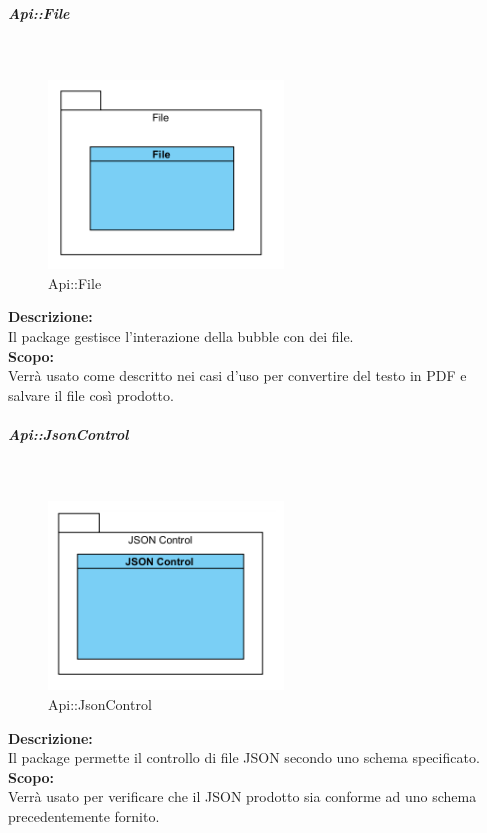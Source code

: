 \begin{samepage}
\subparagraph{Api\-::File}\label{api-file}\mbox{}\\
\nopagebreak
\begin{figure}[H]
	\centering
	\includegraphics[height=5cm]{diagrammi_img/classi_e_package/api_file.png}
	\caption{Api\-::File}
\end{figure}
\end{samepage}
\textbf{Descrizione:}\\ 
Il package gestisce l'interazione della bubble con dei file.\\ 
\textbf{Scopo:}\\
Verrà usato come descritto nei casi d'uso per convertire del testo in PDF e salvare il file così prodotto.

\begin{samepage}
\subparagraph{Api\-::Json\-Control}\label{api-json}\mbox{}\\
\nopagebreak
\begin{figure}[H]
	\centering
	\includegraphics[height=5cm]{diagrammi_img/classi_e_package/api_json.png}
	\caption{Api\-::Json\-Control}
\end{figure}
\end{samepage}
\textbf{Descrizione:}\\ 
Il package permette il controllo di file JSON secondo uno schema specificato.\\ 
\textbf{Scopo:}\\
Verrà usato per verificare che il JSON prodotto sia conforme ad uno schema precedentemente fornito.


